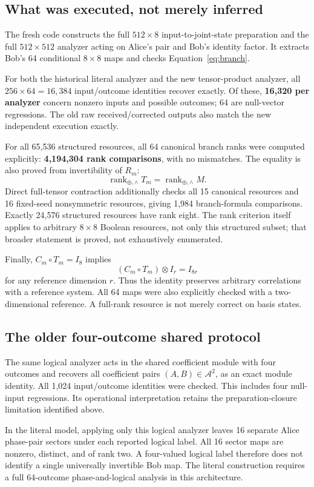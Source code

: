 \documentclass[11pt,a4paper]{article}
\theoremstyle{definition}\newtheorem{definition}[theorem]{Definition}
\newcommand{\A}{\mathcal A}
\newcommand{\rk}{\operatorname{rank}_{\oplus,\wedge}}
\begin{document}
\subsection{What was executed, not merely inferred}
The fresh code constructs the full $512\times8$ input-to-joint-state preparation and the full $512\times512$ analyzer acting on Alice's pair and Bob's identity factor. It extracts Bob's 64 conditional $8\times8$ maps and checks Equation~\eqref{eq:branch}.

For both the historical literal analyzer and the new tensor-product analyzer, all $256\times64=16,384$ input/outcome identities recover exactly. Of these, \textbf{16,320 per analyzer} concern nonzero inputs and possible outcomes; 64 are null-vector regressions. The old raw received/corrected outputs also match the new independent execution exactly.

For all 65,536 structured resources, all 64 canonical branch ranks were computed explicitly: \textbf{4,194,304 rank comparisons}, with no mismatches. The equality is also proved from invertibility of $R_m$:
\[
 \rk T_m=\rk M.
\]
Direct full-tensor contraction additionally checks all 15 canonical resources and 16 fixed-seed nonsymmetric resources, giving 1,984 branch-formula comparisons. Exactly 24,576 structured resources have rank eight. The rank criterion itself applies to arbitrary $8\times8$ Boolean resources, not only this structured subset; that broader statement is proved, not exhaustively enumerated.

Finally, $C_m\circ T_m=I_8$ implies
\[
 (C_m\circ T_m)\otimes I_r=I_{8r}
\]
for any reference dimension $r$. Thus the identity preserves arbitrary correlations with a reference system. All 64 maps were also explicitly checked with a two-dimensional reference. A full-rank resource is not merely correct on basis states.

\subsection{The older four-outcome shared protocol}
The same logical analyzer acts in the shared coefficient module with four outcomes and recovers all coefficient pairs $(A,B)\in\A^2$, as an exact module identity. All 1,024 input/outcome identities were checked. This includes four null-input regressions. Its operational interpretation retains the preparation-closure limitation identified above.

In the literal model, applying only this logical analyzer leaves 16 separate Alice phase-pair sectors under each reported logical label. All 16 sector maps are nonzero, distinct, and of rank two. A four-valued logical label therefore does not identify a single universally invertible Bob map. The literal construction requires a full 64-outcome phase-and-logical analysis in this architecture.
\end{document}
